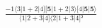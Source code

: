 \documentclass[varwidth, border=5pt]{standalone}
\begin{document}
\begin{my}
$\begin{gathered}
\scriptscriptstyle\frac{-1⟨3|1+2|4][𝟓|1+2|3⟩[4|𝟓|𝟓⟩}{⟨1|2+3|4]⟨2|1+3|4]²}
\end{gathered}$
\end{my}
\end{document}
